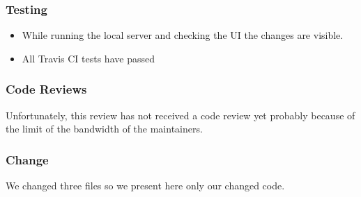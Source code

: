 \documentclass{article}
\begin{document}
\subsubsection{Testing}
\begin{itemize}
  \item While running the local server and checking the UI the changes are visible.
  \item All Travis CI tests have passed
\end{itemize}

\subsubsection{Code Reviews}
Unfortunately, this review has not received a code review yet probably because of the limit of the bandwidth of the maintainers.

\subsubsection{Change}
We changed three files so we present here only our changed code. 
\end{document}
